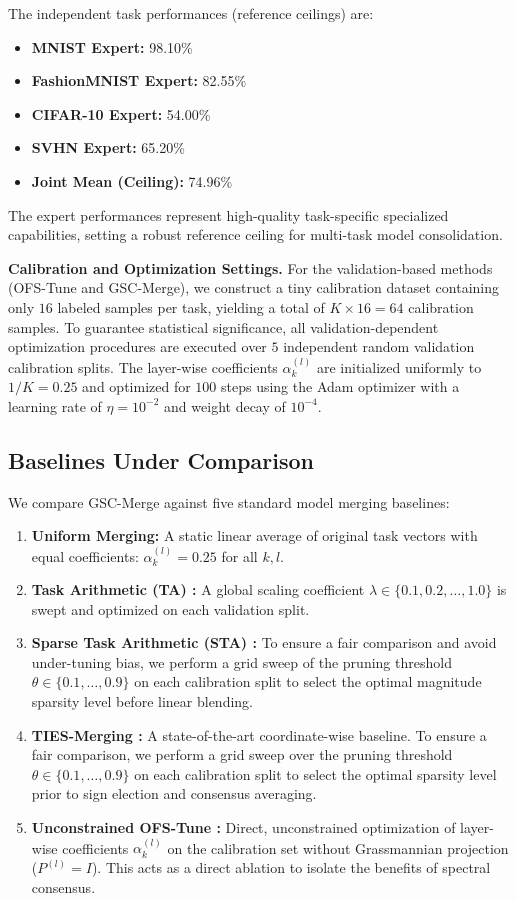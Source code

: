 The independent task performances (reference ceilings) are:
\begin{itemize}
    \item \textbf{MNIST Expert:} 98.10\%
    \item \textbf{FashionMNIST Expert:} 82.55\%
    \item \textbf{CIFAR-10 Expert:} 54.00\%
    \item \textbf{SVHN Expert:} 65.20\%
    \item \textbf{Joint Mean (Ceiling):} 74.96\%
\end{itemize}
The expert performances represent high-quality task-specific specialized capabilities, setting a robust reference ceiling for multi-task model consolidation.

\textbf{Calibration and Optimization Settings.} For the validation-based methods (OFS-Tune and GSC-Merge), we construct a tiny calibration dataset containing only $16$ labeled samples per task, yielding a total of $K \times 16 = 64$ calibration samples. To guarantee statistical significance, all validation-dependent optimization procedures are executed over $5$ independent random validation calibration splits. The layer-wise coefficients $\alpha_k^{(l)}$ are initialized uniformly to $1/K = 0.25$ and optimized for $100$ steps using the Adam optimizer with a learning rate of $\eta = 10^{-2}$ and weight decay of $10^{-4}$.

\subsection{Baselines Under Comparison}
We compare GSC-Merge against five standard model merging baselines:
\begin{enumerate}
    \item \textbf{Uniform Merging:} A static linear average of original task vectors with equal coefficients: $\alpha_k^{(l)} = 0.25$ for all $k, l$.
    \item \textbf{Task Arithmetic (TA) \cite{ilharco2022editing}:} A global scaling coefficient $\lambda \in \{0.1, 0.2, \dots, 1.0\}$ is swept and optimized on each validation split.
    \item \textbf{Sparse Task Arithmetic (STA) \cite{polymerge}:} To ensure a fair comparison and avoid under-tuning bias, we perform a grid sweep of the pruning threshold $\theta \in \{0.1, \dots, 0.9\}$ on each calibration split to select the optimal magnitude sparsity level before linear blending.
    \item \textbf{TIES-Merging \cite{yadav2023ties}:} A state-of-the-art coordinate-wise baseline. To ensure a fair comparison, we perform a grid sweep over the pruning threshold $\theta \in \{0.1, \dots, 0.9\}$ on each calibration split to select the optimal sparsity level prior to sign election and consensus averaging.
    \item \textbf{Unconstrained OFS-Tune \cite{ofstune}:} Direct, unconstrained optimization of layer-wise coefficients $\alpha_k^{(l)}$ on the calibration set without Grassmannian projection ($P^{(l)} = I$). This acts as a direct ablation to isolate the benefits of spectral consensus.
\end{enumerate}

